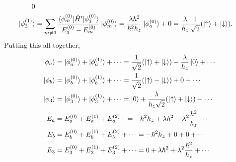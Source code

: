 \documentclass[10pt]{article}
\newcommand{\1}{\mathbf 1}
\begin{document}
\begin{align}
	0
	\\
	\ket{\phi^{(1)}_3}
	&=
	\sum_{m \ne 3}
	\frac{\braket{\phi_m^{(0)} | \hat H' | \phi_3^{(0)}}}{E_3^{(0)} - E_m^{(0)}}
	\ket{\phi_m^{(0)}}
	=
	\frac{\lambda\hbar^2}{\hbar^2 h_z}
	\ket{\phi_a^{(0)}}
	+
	0
	=
	\frac{\lambda}{h_z} \frac{1}{\sqrt{2}}
	(\ket{\uparrow} + \ket{\downarrow}).
\end{align}
Putting this all together,
\begin{align}
	\ket{\phi_a}
	&=
	\ket{\phi_a^{(0)}}
	+
	\ket{\phi_a^{(1)}}
	+
	\cdots
	=
	\frac{1}{\sqrt{2}} (\ket{\uparrow} + \ket{\downarrow})
	-
	\frac{\lambda}{h_z} \ket{0}
	+
	\cdots
	\\
	\ket{\phi_b}
	&=
	\ket{\phi_b^{(0)}}
	+
	\ket{\phi_b^{(1)}}
	+
	\cdots
	=
	\frac{1}{\sqrt{2}} (\ket{\uparrow} - \ket{\downarrow})
	+
	0
	+
	\cdots
	\\
	\ket{\phi_3}
	&=
	\ket{\phi_3^{(0)}}
	+
	\ket{\phi_3^{(1)}}
	+
	\cdots
	=
	\ket{0}
	+
	\frac{\lambda}{h_z\sqrt{2}}
	(\ket{\uparrow}+\ket{\downarrow})
	+
	\cdots
	\\
	E_a
	&=
	E_a^{(0)}
	+
	E_a^{(1)}
	+
	E_a^{(2)}
	+
	=
	-\hbar^2 h_z 
	+
	\lambda\hbar^2
	-
	\lambda^2 \frac{\hbar^2}{h_z}
	\cdots
	\\
	E_b
	&=
	E_b^{(0)}
	+
	E_b^{(1)}
	+
	E_b^{(2)}
	+
	\cdots
	=
	-\hbar^2 h_z 
	+
	0
	+
	0
	+
	\cdots
	\\
	E_3
	&=
	E_3^{(0)}
	+
	E_3^{(1)}
	+
	E_3^{(2)}
	+
	\cdots
	=
	0
	+
	\lambda \hbar^2
	+
	\lambda^2\frac{\hbar^2}{h_z}
	+
	\cdots
\end{align}
\end{document}
